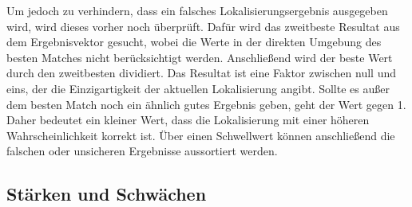 \documentclass[12pt,a4paper,titlepage]{scrartcl}
\begin{document}
Um jedoch zu verhindern, dass ein falsches Lokalisierungsergebnis ausgegeben wird, wird dieses vorher noch überprüft. Dafür wird das zweitbeste Resultat aus dem Ergebnisvektor gesucht, wobei die Werte in der direkten Umgebung des besten Matches nicht berücksichtigt werden. Anschließend wird der beste Wert durch den zweitbesten dividiert. Das Resultat ist eine Faktor zwischen null und eins, der die Einzigartigkeit der aktuellen Lokalisierung angibt. Sollte es außer dem besten Match noch ein ähnlich gutes Ergebnis geben, geht der Wert gegen 1. Daher bedeutet ein kleiner Wert, dass die Lokalisierung mit einer höheren Wahrscheinlichkeit korrekt ist. Über einen Schwellwert können anschließend die falschen oder unsicheren Ergebnisse aussortiert werden.
\newpage
\subsection{Stärken und Schwächen}
\end{document}
